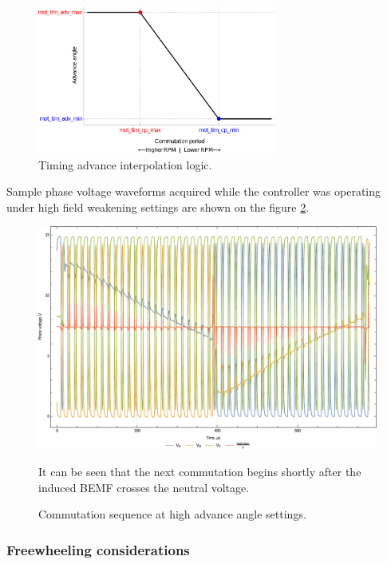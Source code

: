 \documentclass{zubaxdoc}
\begin{document}
\begin{figure}[hbt]
    \centering
	\includegraphics[width=0.7\textwidth]{timing_advance_interpolation_plot}
	\caption{Timing advance interpolation logic.
	\label{timing_advance_interpolation_plot}}
\end{figure}

Sample phase voltage waveforms acquired while the controller was operating under high field
weakening settings are shown on the figure \ref{phase_voltages_at_high_advance_angle}.

\begin{figure}[hbtp]
    \centering
	\includegraphics[width=\textwidth]{phase_voltages_at_high_advance_angle}
	\caption{Commutation sequence at high advance angle settings.
	\label{phase_voltages_at_high_advance_angle}}
	It can be seen that the next commutation begins shortly after the induced BEMF
	crosses the neutral voltage.
\end{figure}

\subsubsection{Freewheeling considerations}
\end{document}
